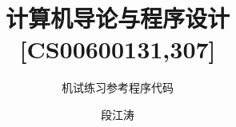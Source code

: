 \documentclass[graybox,envcountchap,sectrefs]{svmono}
\begin{document}
\author{段江涛}
\title{ 计算机导论与程序设计[CS00600131,307]}
\subtitle{机试练习参考程序代码 }



\date{\zhtoday}

\maketitle  %



\tableofcontents   %












\end{document}
